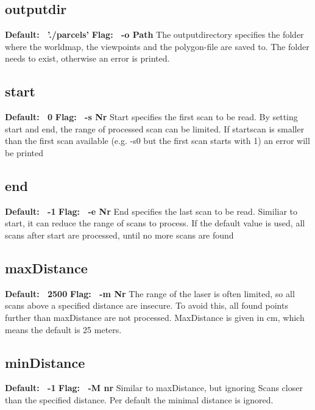 \documentclass{article}
\begin{document}
\subsection{outputdir}
{\bf Default: \ './parcels'} \newline
{\bf Flag: \ -o Path} \newline
The outputdirectory specifies the folder where the worldmap, the viewpoints
and the polygon-file are saved to. The folder needs to exist, otherwise an
error is printed.

\subsection{start}
{\bf Default: \ 0} \newline
{\bf Flag: \ -s Nr} \newline
Start specifies the first scan to be read. By setting start and end, the range
of processed scan can be limited.
If startscan is smaller than the first scan available (e.g. -s0 but the first
scan starts with 1) an error will be printed

\subsection{end}
{\bf Default: \ -1} \newline
{\bf Flag: \ -e Nr} \newline
End specifies the last scan to be read. Similiar to start, it can reduce the
range of scans to process.
If the default value is used, all scans after start are processed, until no
more scans are found

\subsection{maxDistance}
{\bf Default: \ 2500} \newline
{\bf Flag: \ -m Nr} \newline
The range of the laser is often limited, so all scans above a specified
distance are insecure. To avoid this, all found points further than
maxDistance are not processed.
MaxDistance is given in cm, which means the default is 25 meters.

\subsection{minDistance}
{\bf Default: \ -1} \newline
{\bf Flag: \ -M nr} \newline
Similar to maxDistance, but ignoring Scans closer than the specified
distance. Per default the minimal distance is ignored.
\end{document}
